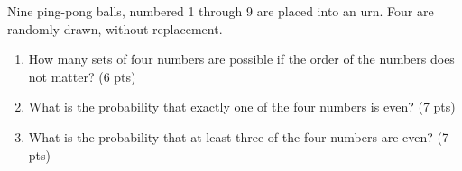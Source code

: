 
\item Nine ping-pong balls, numbered 1 through 9 are placed into an urn. Four are randomly drawn, without replacement.

\begin{enumerate}

\item How many sets of four numbers are possible if the order of the numbers does not matter? (6 pts)

\vfill

\item What is the probability that exactly one of the four numbers is even? (7 pts)

\vfill


\item What is the probability that at least three of the four numbers are even? (7 pts)

\vfill

\end{enumerate}
